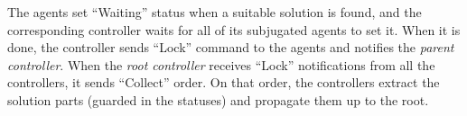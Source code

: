 The agents set ``Waiting'' status when a suitable solution is found,
and the corresponding controller waits for all of its subjugated
agents to set it. When it is done, the controller sends ``Lock''
command to the agents and notifies the \emph{parent controller}.
When the \emph{root controller} receives ``Lock'' notifications from
all the controllers, it sends ``Collect'' order. On that order, the controllers
extract the solution parts (guarded in the statuses) and propagate them up to
the root.















